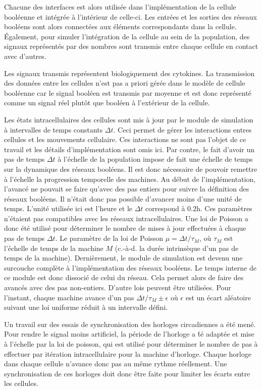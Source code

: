 \documentclass[11pt, a4paper]{article}
\begin{document}
Chacune des interfaces est alors utilisée dans l'implémentation de la cellule
booléenne et intégrée à l'intérieur de celle-ci. Les entrées et les sorties des
réseaux booléens sont alors connectées aux éléments correspondants dans la
cellule. Également, pour simuler l'intégration de la cellule au sein de la
population, des signaux représentés par des nombres sont transmis entre chaque
cellule en contact avec d'autres.

Les signaux transmis représentent biologiquement des cytokines. La transmission
des données entre les cellules n'est pas a priori gérée dans le modèle de
cellule booléenne car le signal booléen est transmis par moyenne et est donc
représenté comme un signal réel plutôt que bool\'een à l'extérieur de la cellule.

Les états intracellulaires des cellules sont mis à jour par le module de
simulation à intervalles de temps constants $\Delta t$. Ceci permet de gérer
les interactions entres cellules et les mouvements cellulaire. Ces interactions
ne sont pas l'objet de ce travail et les détails d'implémentation sont omis
ici. Par contre, le fait d'avoir un pas de temps $\Delta t$ à l'échelle de la
population impose de fait une échelle de temps sur la dynamique des réseaux
booléens. Il est donc nécessaire de pouvoir remettre à l'échelle la progression
temporelle des machines. Au début de l'implémentation, l'avancé ne pouvait se
faire qu'avec des pas entiers pour suivre la définition des réseaux booléens.
Il n'était donc pas possible d'avancer moins d'une unité de temps. L'unité
utilisée ici est l'heure et le $\Delta t$ correspond à $0.2$h. Ces paramètres
n'étaient pas compatibles avec les réseaux intracellulaires. Une loi de Poisson
a donc été utilisé pour déterminer le nombre de mises à jour effectuées à
chaque pas de temps $\Delta t$. Le paramètre de la loi de Poisson $\mu = \Delta
t / \tau_M$, où $\tau_M$ est l'échelle de temps de la machine $M$ (c.-à-d. la
durée intrinsèque d'un pas de temps de la machine). Dernièrement, le module de
simulation est devenu une surcouche complète à l'implémentation des réseaux
booléens. Le temps interne de ce module est donc dissocié de celui du réseau.
Cela permet alors de faire des avancés avec des pas non-entiers. D'autre lois
peuvent être utilisées. Pour l'instant, chaque machine avance d'un pas $\Delta
t / \tau_M \pm \epsilon$ où $\epsilon$ est un écart aléatoire suivant une loi
uniforme réduit à un intervalle défini.

Un travail sur des essais de synchronisation des horloges
circadiennes a été mené. Pour rendre le signal moins artificiel, la p\'eriode de l'horloge 
a \'t\'e adapt\'ee et mise à l'\'echelle par la
loi de poisson, qui est utilisé pour d\'eterminer le nombre de pas à effectuer par
itération intracellulaire pour la machine d'horloge. Chaque horloge dans
chaque cellule n'avance donc pas au même rythme réellement. Une synchronisation
de ces horloges doit donc être faite pour limiter les écarts entre les
cellules.
\end{document}
